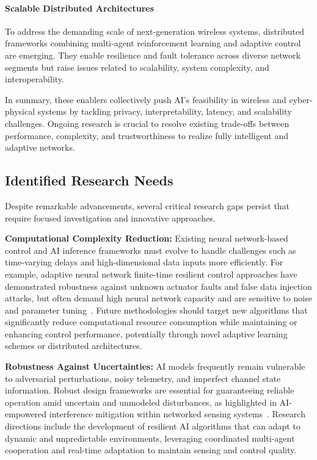 \documentclass[sigconf]{acmart}
\begin{document}
\paragraph{Scalable Distributed Architectures} To address the demanding scale of next-generation wireless systems, distributed frameworks combining multi-agent reinforcement learning and adaptive control are emerging. They enable resilience and fault tolerance across diverse network segments but raise issues related to scalability, system complexity, and interoperability.

In summary, these enablers collectively push AI's feasibility in wireless and cyber-physical systems by tackling privacy, interpretability, latency, and scalability challenges. Ongoing research is crucial to resolve existing trade-offs between performance, complexity, and trustworthiness to realize fully intelligent and adaptive networks.

\subsection{Identified Research Needs}

Despite remarkable advancements, several critical research gaps persist that require focused investigation and innovative approaches.

\textbf{Computational Complexity Reduction:} Existing neural network-based control and AI inference frameworks must evolve to handle challenges such as time-varying delays and high-dimensional data inputs more efficiently. For example, adaptive neural network finite-time resilient control approaches have demonstrated robustness against unknown actuator faults and false data injection attacks, but often demand high neural network capacity and are sensitive to noise and parameter tuning~\cite{ref46}. Future methodologies should target new algorithms that significantly reduce computational resource consumption while maintaining or enhancing control performance, potentially through novel adaptive learning schemes or distributed architectures.

\textbf{Robustness Against Uncertainties:} AI models frequently remain vulnerable to adversarial perturbations, noisy telemetry, and imperfect channel state information. Robust design frameworks are essential for guaranteeing reliable operation amid uncertain and unmodeled disturbances, as highlighted in AI-empowered interference mitigation within networked sensing systems~\cite{ref48}. Research directions include the development of resilient AI algorithms that can adapt to dynamic and unpredictable environments, leveraging coordinated multi-agent cooperation and real-time adaptation to maintain sensing and control quality.
\end{document}
